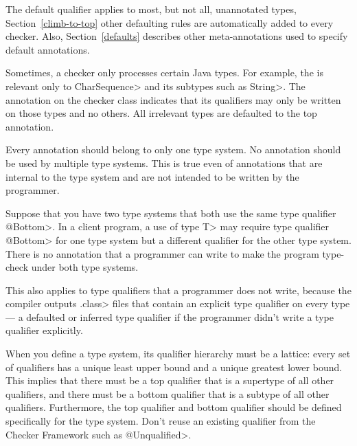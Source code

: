 The default qualifier applies to most, but not all, unannotated types, Section~\ref{climb-to-top}
other defaulting rules are automatically added to every checker. Also, Section~\ref{defaults}
describes other meta-annotations used to specify default annotations.


Sometimes, a checker only processes certain Java types.  For example, the
 is relevant only to
\<CharSequence> and its subtypes such as \<String>.
The 
annotation on the checker class indicates that its qualifiers may only be
written on those types and no others.  All irrelevant types are defaulted to
the top annotation.



Every annotation should belong to only one type system.  No annotation
should be used by multiple type systems.  This is true even of annotations
that are internal to the type system and are not intended to be written by
the programmer.

Suppose that you have two type systems that both use the same type
qualifier \<@Bottom>.  In a client program, a use of type \<T> may require type
qualifier \<@Bottom> for one type system but a different qualifier for the other
type system.  There is no annotation that a programmer can write to make
the program type-check under both type systems.

This also applies to type qualifiers that a programmer does not write,
because the compiler outputs \<.class> files that contain an explicit type
qualifier on every type --- a defaulted or inferred type qualifier if the
programmer didn't write a type qualifier explicitly.



When you define a type system, its qualifier hierarchy must be a
lattice:  every set of qualifiers has a unique least upper bound and a unique
greatest lower bound.  This implies that there must be a top qualifier that is a
supertype of all other qualifiers, and there must be a bottom qualifier that is a
subtype of all other qualifiers.
Furthermore, the top qualifier and bottom qualifier should be defined
specifically for the type system.  Don't reuse an existing qualifier from the
Checker Framework such as \<@Unqualified>.


